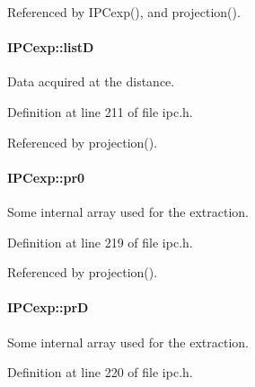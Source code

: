 Referenced by IPCexp(), and projection().

\hypertarget{classIPCexp_a2de69c106bac7e655eff375d837db93f}{
\paragraph[{listD}]{ {\bf IPCexp::listD}}\hfill}
\label{classIPCexp_a2de69c106bac7e655eff375d837db93f}


Data acquired at the distance. 



Definition at line 211 of file ipc.h.



Referenced by projection().

\hypertarget{classIPCexp_a0ea33fdf3c3f295d399cee5a4cdc7a61}{
\paragraph[{pr0}]{ {\bf IPCexp::pr0}}\hfill}
\label{classIPCexp_a0ea33fdf3c3f295d399cee5a4cdc7a61}


Some internal array used for the extraction. 



Definition at line 219 of file ipc.h.



Referenced by projection().

\hypertarget{classIPCexp_ae5330aaaf27f34de4c2924d1b48f24f4}{
\paragraph[{prD}]{ {\bf IPCexp::prD}}\hfill}
\label{classIPCexp_ae5330aaaf27f34de4c2924d1b48f24f4}


Some internal array used for the extraction. 



Definition at line 220 of file ipc.h.



